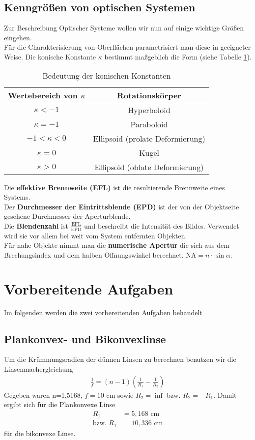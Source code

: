 \documentclass[twoside,colorback,accentcolor=tud4c,11pt]{tudreport}
\begin{document}
\section{Kenngrößen von optischen Systemen}
Zur Beschreibung Optischer Systeme wollen wir nun auf einige wichtige Größen eingehen. \\
Für die Charakterisierung von Oberflächen parametrisiert man diese in geeigneter Weise. Die konische Konstante $ \kappa $ bestimmt maßgeblich die Form (siehe Tabelle \ref{tab:kappa}).
\begin{table}[H]
\centering
\begin{tabular}{|c|c|}
\hline 
Wertebereich von $ \kappa $ & Rotationskörper \\ 
\hline 
$ \kappa <-1 $ & Hyperboloid \\  
$ \kappa =-1 $ & Paraboloid \\ 
$-1< \kappa <0 $ & Ellipsoid (prolate Deformierung) \\ 
$ \kappa =0 $ & Kugel \\ 
$ \kappa >0 $ & Ellipsoid (oblate Deformierung) \\ 
\hline 
\end{tabular} 
\caption{Bedeutung der konischen Konstanten \cite{anl}}\label{tab:kappa}
\end{table}
Die \textbf{effektive Brennweite (EFL)} ist die resultierende Brennweite eines Systems. \\
Der \textbf{Durchmesser der Eintrittsblende (EPD)} ist der von der Objektseite gesehene Durchmesser der Aperturblende. \\
Die \textbf{Blendenzahl} ist $ \frac{\text{EFL}}{\text{EPD}} $ und beschreibt die Intensität des Bildes. Verwendet wird sie vor allem bei weit vom System entfernten Objekten. \\
Für nahe Objekte nimmt man die \textbf{numerische Apertur} die sich aus dem Brechungsindex und dem halben Öffnungswinkel berechnet. NA$ =n\cdot\sin\alpha $.\\
\chapter{Vorbereitende Aufgaben}
Im folgenden werden die zwei vorbereitenden Aufgaben behandelt
\section{Plankonvex- und Bikonvexlinse}
Um die Krümmungsradien der dünnen Linsen zu berechnen benutzen wir die Linsenmachergleichung
\begin{align}
\frac{1}{f}=(n-1)\left(\frac{1}{R_1}-\frac{1}{R_2}\right)
\end{align}
Gegeben waren n=1,5168, $ f=10 $ cm sowie $ R_2=\inf $ bzw. $ R_2=-R_1 $. Damit ergibt sich für die Plankonvexe Linse
\begin{align}
R_1&=5,168\text{ cm}\\
\text{bzw. }R_1&=10,336\text{ cm}
\end{align}
für die bikonvexe Linse.
\end{document}
